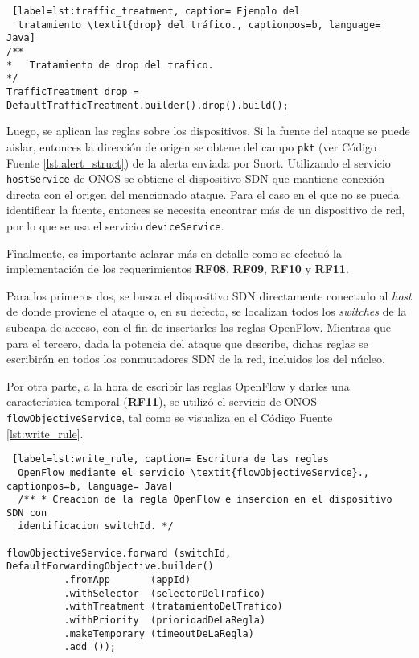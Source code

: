 \begin{lstlisting} [label=lst:traffic_treatment, caption= Ejemplo del
  tratamiento \textit{drop} del tráfico., captionpos=b, language= Java]
/**
* 	Tratamiento de drop del trafico.
*/
TrafficTreatment drop = DefaultTrafficTreatment.builder().drop().build();

\end{lstlisting}

Luego, se aplican las reglas sobre los dispositivos. Si la fuente del ataque se
puede aislar, entonces la dirección de origen se obtene del campo \verb|pkt| (ver Código
Fuente \ref{lst:alert_struct}) de la alerta enviada por Snort. Utilizando el
servicio \verb|hostService| de ONOS se obtiene el dispositivo SDN que mantiene
conexión directa con el origen del mencionado ataque. Para el caso en el que no
se pueda identificar la fuente, entonces se necesita encontrar más de un
dispositivo de red, por lo que se usa el servicio \verb|deviceService|.

Finalmente, es importante aclarar más en detalle como se efectuó la
implementación de los requerimientos \textbf{RF08}, \textbf{RF09}, \textbf{RF10}
y \textbf{RF11}.

Para los primeros dos, se busca el dispositivo SDN directamente conectado al
\textit{host} de donde proviene el ataque o, en su defecto, se localizan todos
los \textit{switches} de la subcapa de acceso, con el fin de insertarles las
reglas OpenFlow. Mientras que para el tercero, dada la potencia del ataque que
describe, dichas reglas se escribirán en todos los conmutadores SDN de la red,
incluidos los del núcleo.
 

Por otra parte, a la hora de escribir las reglas OpenFlow y darles una
característica temporal (\textbf{RF11}), se utilizó el servicio de ONOS
\verb|flowObjectiveService|, tal como se visualiza en el Código Fuente
\ref{lst:write_rule}.\\

\begin{lstlisting} [label=lst:write_rule, caption= Escritura de las reglas
  OpenFlow mediante el servicio \textit{flowObjectiveService}., captionpos=b, language= Java]
  /** * Creacion de la regla OpenFlow e insercion en el dispositivo SDN con
  identificacion switchId. */

flowObjectiveService.forward (switchId, DefaultForwardingObjective.builder()
          .fromApp       (appId)
          .withSelector  (selectorDelTrafico)
          .withTreatment (tratamientoDelTrafico)
          .withPriority  (prioridadDeLaRegla)
          .makeTemporary (timeoutDeLaRegla)
          .add ());
\end{lstlisting}


